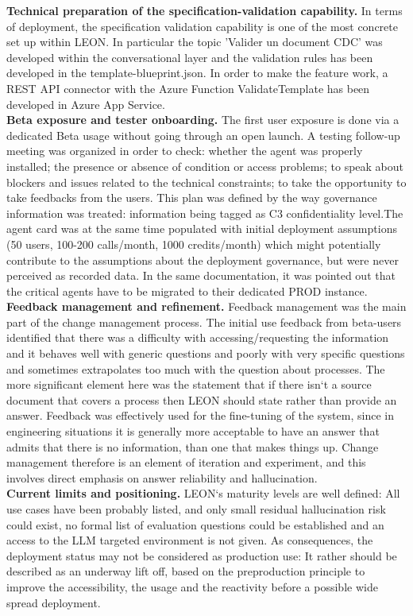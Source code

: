 \noindent\textbf{Technical preparation of the specification-validation capability.} In terms of deployment, the specification validation capability is one of the most concrete set up within LEON. In particular the topic 'Valider un document CDC' was developed within the conversational layer and the validation rules has been developed in the template-blueprint.json. In order to make the feature work, a REST API connector with the Azure Function ValidateTemplate has been developed in Azure App Service. \\

\noindent\textbf{Beta exposure and tester onboarding.} The first user exposure is done via a dedicated Beta usage without going through an open launch. A testing follow-up meeting was organized in order to check: whether the agent was properly installed; the presence or absence of condition or access problems; to speak about blockers and issues related to the technical constraints; to take the opportunity to take feedbacks from the users. This plan was defined by the way governance information was treated: information being tagged as C3 confidentiality level.The agent card was at the same time populated with initial deployment assumptions (50 users, 100-200 calls/month, 1000 credits/month) which might potentially contribute to the assumptions about the deployment governance, but were never perceived as recorded data. In the same documentation, it was pointed out that the critical agents have to be migrated to their dedicated PROD instance.\\

\noindent\textbf{Feedback management and refinement.} Feedback management was the main part of the change management process. The initial use feedback from beta-users identified that there was a difficulty with accessing/requesting the information and it behaves well with generic questions and poorly with very specific questions and sometimes extrapolates too much with the question about processes. The more significant element here was the statement that if there isn‘t a source document that covers a process then LEON should state rather than provide an answer. Feedback was effectively used for the fine-tuning of the system, since in engineering situations it is generally more acceptable to have an answer that admits that there is no information, than one that makes things up. Change management therefore is an element of iteration and experiment, and this involves direct emphasis on answer reliability and hallucination.\\

\noindent\textbf{Current limits and positioning.} LEON‘s maturity levels are well defined: All use cases have been probably listed, and only small residual hallucination risk could exist, no formal list of evaluation questions could be established and an access to the LLM targeted environment is not given. As consequences, the deployment status may not be considered as production use: It rather should be described as an underway lift off, based on the preproduction principle to improve the accessibility, the usage and the reactivity before a possible wide spread deployment.